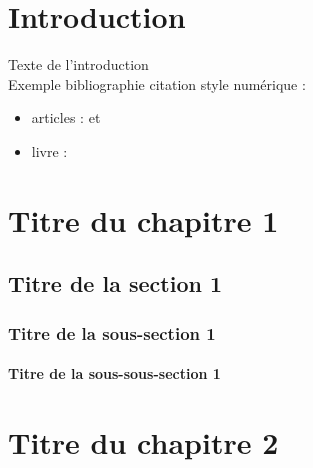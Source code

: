 \documentclass[a4paper,11pt,twoside,openright,notitlepage]{book}
\begin{document}


\chapter*{Introduction}
\adjustmtc
{}

\newpage

Texte de l'introduction \\

Exemple bibliographie citation style numérique :

\begin{itemize}
\item[•] articles :  \cite{Zhou2015} et \cite{Patil2015,Eriksson2016}
\item[•] livre : \cite{Morand1995} 
\end{itemize}





\chapter{Titre du chapitre 1}
\minitoc   %

\newpage
\section{Titre de la section 1}
\subsection{Titre de la sous-section 1}
\subsubsection{Titre de la sous-sous-section 1}



\chapter{Titre du chapitre 2}
\minitoc   %
\end{document}
